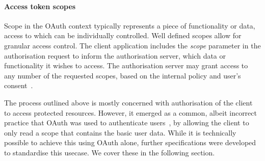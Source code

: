 \paragraph{Access token scopes}
Scope in the OAuth context typically represents a piece of functionality or data, access to which can be individually controlled. Well defined scopes allow for granular access control. The client application includes the \textit{scope} parameter in the authorisation request to inform the authorisation server, which data or functionality it wishes to access. The authorisation server may grant access to any number of the requested scopes, based on the internal policy and user's consent~\cite{Hardt2012TheFramework}.

The process outlined above is mostly concerned with authorisation of the client to access protected resources. However, it emerged as a common, albeit incorrect practice that OAuth was used to authenticate users~\cite{RicherUser2.0}, by allowing the client to only read a scope that contains the basic user data. While it is technically possible to achieve this using OAuth alone, further specifications were developed to standardise this usecase. We cover these in the following section.
